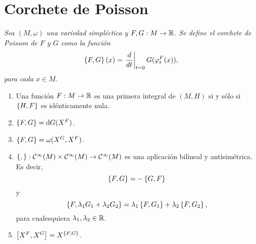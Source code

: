 \section{Corchete de Poisson}\label{5}
\begin{defn}
  \em
  Sea $(M,\omega)$ una variedad simpléctica y $F,G: M \rightarrow \mathbb{R}$. Se define el \emph{corchete de Poisson de $F$ y $G$} como la función
\begin{equation*}
  \left\lbrace F,G\right\rbrace(x) = \left.\frac{d}{dt}\right|_{t=0}G(\varphi^F_t(x)),
\end{equation*}
para cada $x \in M$.
\end{defn}
\begin{prop}\leavevmode
  \begin{enumerate}
    \item Una función $F:M \rightarrow \mathbb{R}$ es una primera integral de $(M,H)$ si y sólo si $\left\lbrace H,F\right\rbrace$ es idénticamente nula.
    \item $\left\lbrace F,G\right\rbrace = \mathrm{d} G (X^F)$.
    \item $\left\lbrace F,G\right\rbrace = \omega(X^ G, X^F)$.
    \item $\left\lbrace , \right\rbrace: \mathcal{C}^{\infty}(M) \times \mathcal{C}^{\infty}(M) \rightarrow \mathcal{C}^{\infty}(M)$ es una aplicación bilineal y antisimétrica. Es decir, 
      \begin{equation*}
	\left\lbrace F,G\right\rbrace  =  -\left\lbrace G,F\right\rbrace \\
      \end{equation*}
      y
      \begin{equation*}
	\left\lbrace F,\lambda_1 G_1 + \lambda_2 G_2\right\rbrace  =  \lambda_1 \left\lbrace F,G_1\right\rbrace + \lambda_2 \left\lbrace F,G_2\right\rbrace,
      \end{equation*}
      para cualesquiera $\lambda_1, \lambda_2 \in \mathbb{R}$.
    \item $\left[X^F,X^G\right] = X^{\left\lbrace F,G\right\rbrace}$.
  \end{enumerate}
\end{prop}
